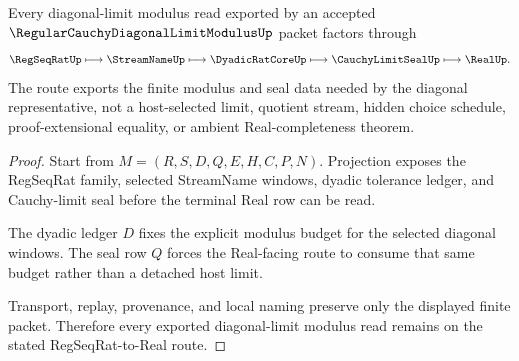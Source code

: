 \begin{theorem}
\label{thm:regular-cauchy-diagonal-limit-modulus-real-route}
Every diagonal-limit modulus read exported by an accepted $\RegularCauchyDiagonalLimitModulusUp$ packet factors through
$$
\RegSeqRatUp \longmapsto \StreamNameUp \longmapsto \DyadicRatCoreUp \longmapsto \CauchyLimitSealUp \longmapsto \RealUp .
$$
The route exports the finite modulus and seal data needed by the diagonal representative, not a host-selected limit, quotient stream, hidden choice schedule, proof-extensional equality, or ambient Real-completeness theorem.
\end{theorem}
\begin{proof}
Start from $M=(R,S,D,Q,E,H,C,P,N)$. Projection exposes the RegSeqRat family, selected StreamName windows, dyadic tolerance ledger, and Cauchy-limit seal before the terminal Real row can be read.

The dyadic ledger $D$ fixes the explicit modulus budget for the selected diagonal windows. The seal row $Q$ forces the Real-facing route to consume that same budget rather than a detached host limit.

Transport, replay, provenance, and local naming preserve only the displayed finite packet. Therefore every exported diagonal-limit modulus read remains on the stated RegSeqRat-to-Real route.
\end{proof}


\begin{closurestatus}{\RegularCauchyDiagonalLimitModulusUp}
  \theoryclosure{\seedClosure}
  \formalstatus{\unformalizedV}
\end{closurestatus}
